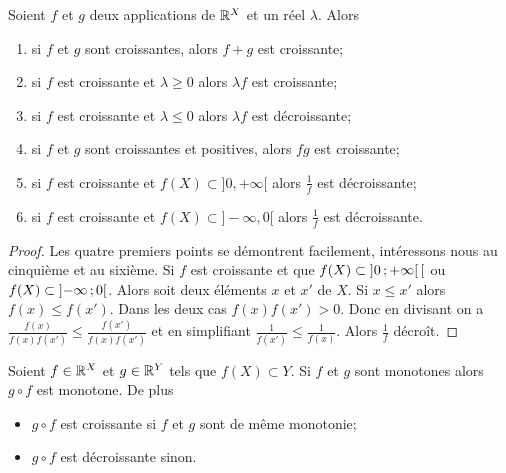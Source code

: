 \begin{prop}
  Soient $f$ et $g$ deux applications de $\mathbb{R}^X$ et un réel $\lambda$. Alors
  \begin{enumerate}
  \item si $f$ et $g$ sont croissantes, alors $f+g$ est croissante;
  \item si $f$ est croissante et $\lambda \geq 0$ alors $\lambda f$ est croissante;
  \item si $f$ est croissante et $\lambda \leq 0$ alors $\lambda f$ est décroissante;
  \item si $f$ et $g$ sont croissantes et positives, alors $fg$ est croissante;
  \item si $f$ est croissante et $f(X)\subset ]0,+\infty[$ alors $\frac{1}{f}$ est décroissante;
  \item si $f$ est croissante et $f(X)\subset ]-\infty, 0[$ alors $\frac{1}{f}$ est décroissante.
  \end{enumerate}
\end{prop}
\begin{proof}
  Les quatre premiers points se démontrent facilement, intéressons nous au cinquième et au sixième. Si $f$ est croissante et que $f(X)\subset \left] 0 \, ;  +\infty \right[[$ ou $f(X)\subset \left] -\infty \, ;  0 \right[$. Alors soit deux éléments $x$ et $x'$ de $X$. Si $x \leq x'$  alors $f(x) \leq f(x')$. Dans les deux cas $f(x)f(x') > 0$. Donc en divisant on a $\frac{f(x)}{f(x)f(x')} \leq \frac{f(x')}{f(x)f(x')}$ et en simplifiant $\frac{1}{f(x')} \leq \frac{1}{f(x)}$. Alors $\frac{1}{f}$ décroît.
\end{proof}
\begin{theo}
  Soient $f \in \mathbb{R}^X$ et $g \in \mathbb{R}^Y$ tels que $f(X) \subset Y$. Si $f$ et $g$ sont monotones alors $g \circ f$ est monotone. De plus
  \begin{itemize}
  \item $g \circ f$ est croissante si $f$ et $g$ sont de même monotonie;
  \item $g \circ f$ est décroissante sinon.
  \end{itemize}
\end{theo}

